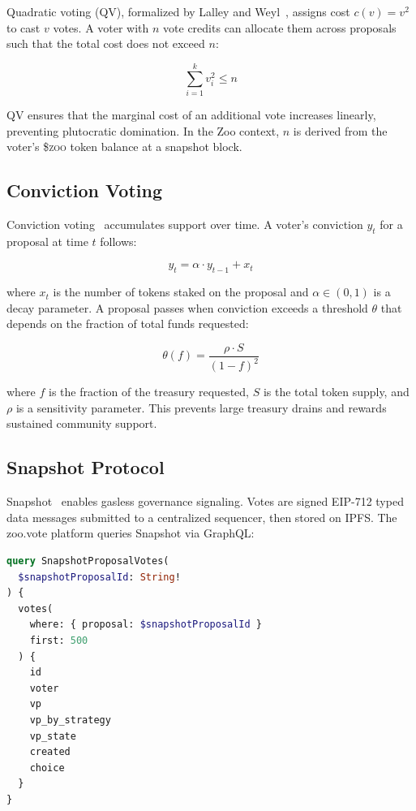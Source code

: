 \documentclass[11pt,letterpaper]{article}
\newcommand{\ZOO}{\$\textsc{zoo}}
\begin{document}
Quadratic voting (QV), formalized by Lalley and Weyl~\cite{lalley2018quadratic}, assigns cost $c(v) = v^2$ to cast $v$ votes. A voter with $n$ vote credits can allocate them across proposals such that the total cost does not exceed $n$:

\begin{equation}
\sum_{i=1}^{k} v_i^2 \leq n
\end{equation}

QV ensures that the marginal cost of an additional vote increases linearly, preventing plutocratic domination. In the Zoo context, $n$ is derived from the voter's \ZOO{} token balance at a snapshot block.

\subsection{Conviction Voting}

Conviction voting~\cite{conviction2019} accumulates support over time. A voter's conviction $y_t$ for a proposal at time $t$ follows:

\begin{equation}
y_t = \alpha \cdot y_{t-1} + x_t
\end{equation}

where $x_t$ is the number of tokens staked on the proposal and $\alpha \in (0,1)$ is a decay parameter. A proposal passes when conviction exceeds a threshold $\theta$ that depends on the fraction of total funds requested:

\begin{equation}
\theta(f) = \frac{\rho \cdot S}{(1-f)^2}
\end{equation}

where $f$ is the fraction of the treasury requested, $S$ is the total token supply, and $\rho$ is a sensitivity parameter. This prevents large treasury drains and rewards sustained community support.

\subsection{Snapshot Protocol}

Snapshot~\cite{snapshot2020} enables gasless governance signaling. Votes are signed EIP-712 typed data messages submitted to a centralized sequencer, then stored on IPFS. The zoo.vote platform queries Snapshot via GraphQL:

\begin{lstlisting}[language=GraphQL,caption=Snapshot proposal votes query]
query SnapshotProposalVotes(
  $snapshotProposalId: String!
) {
  votes(
    where: { proposal: $snapshotProposalId }
    first: 500
  ) {
    id
    voter
    vp
    vp_by_strategy
    vp_state
    created
    choice
  }
}
\end{lstlisting}
\end{document}
